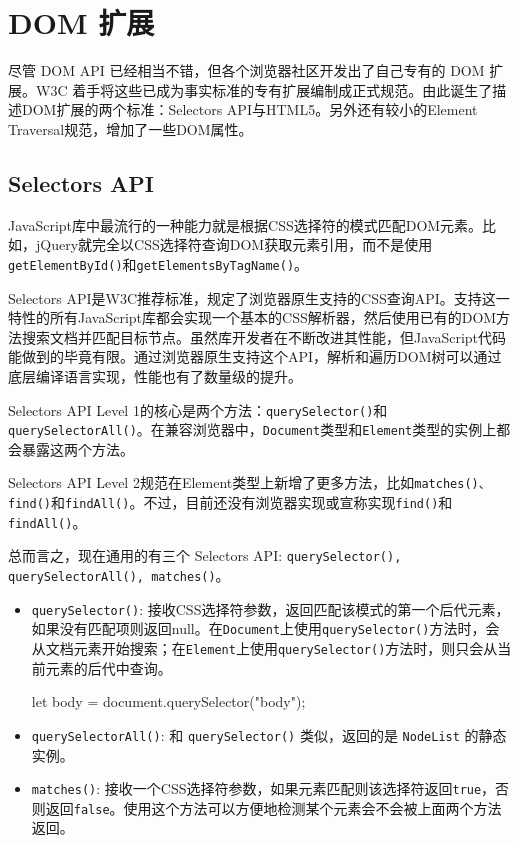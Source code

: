\section{DOM 扩展}

尽管 DOM API 已经相当不错，但各个浏览器社区开发出了自己专有的 DOM 扩展。W3C 着手将这些已成为事实标准的专有扩展编制成正式规范。由此诞生了描述DOM扩展的两个标准：Selectors  API与HTML5。另外还有较小的Element Traversal规范，增加了一些DOM属性。

\subsection{Selectors API}

JavaScript库中最流行的一种能力就是根据CSS选择符的模式匹配DOM元素。比如，jQuery就完全以CSS选择符查询DOM获取元素引用，而不是使用\texttt{getElementById()}和\texttt{getElementsByTagName()}。

Selectors API是W3C推荐标准，规定了浏览器原生支持的CSS查询API。支持这一特性的所有JavaScript库都会实现一个基本的CSS解析器，然后使用已有的DOM方法搜索文档并匹配目标节点。虽然库开发者在不断改进其性能，但JavaScript代码能做到的毕竟有限。通过浏览器原生支持这个API，解析和遍历DOM树可以通过底层编译语言实现，性能也有了数量级的提升。

Selectors API Level 1的核心是两个方法：\texttt{querySelector()}和\texttt{querySelectorAll()}。在兼容浏览器中，\texttt{Document}类型和\texttt{Element}类型的实例上都会暴露这两个方法。

Selectors API Level 2规范在Element类型上新增了更多方法，比如\texttt{matches()、find()}和\texttt{findAll()}。不过，目前还没有浏览器实现或宣称实现\texttt{find()}和\texttt{findAll()}。

总而言之，现在通用的有三个 Selectors API: \texttt{querySelector(), querySelectorAll(), matches()}。
\begin{itemize}
    \item \texttt{querySelector()}: 接收CSS选择符参数，返回匹配该模式的第一个后代元素，如果没有匹配项则返回null。在\texttt{Document}上使用\texttt{querySelector()}方法时，会从文档元素开始搜索；在\texttt{Element}上使用\texttt{querySelector()}方法时，则只会从当前元素的后代中查询。
\begin{JavaScript}
let body = document.querySelector("body"); 
\end{JavaScript}
    \item \texttt{querySelectorAll()}: 和 \texttt{querySelector()} 类似，返回的是 \texttt{NodeList} 的静态实例。
    \item \texttt{matches()}: 接收一个CSS选择符参数，如果元素匹配则该选择符返回\texttt{true}，否则返回\texttt{false}。使用这个方法可以方便地检测某个元素会不会被上面两个方法返回。
\end{itemize}

